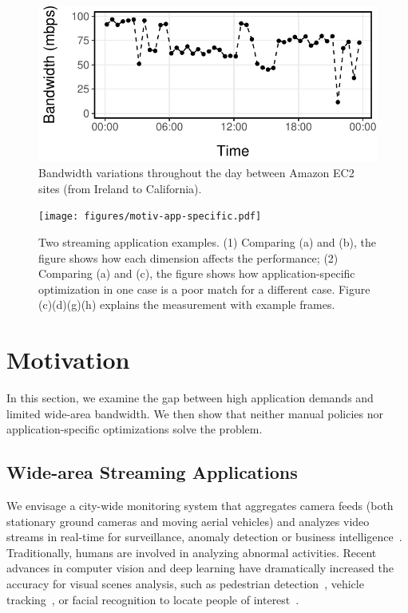 \begin{figure}
  \centering
  \includegraphics[width=.95\linewidth]{figures/aws-variation.pdf}
  \caption{Bandwidth variations throughout the day between Amazon EC2 sites
    (from Ireland to California).}
  \label{fig:bw}
\end{figure}

\begin{figure}
  \centering
  \texttt{[image: figures/motiv-app-specific.pdf]}
  \caption{Two streaming application examples. (1) Comparing (a) and (b), the
    figure shows how each dimension affects the performance; (2) Comparing (a)
    and (c), the figure shows how application-specific optimization in one case
    is a poor match for a different case. Figure (c)(d)(g)(h) explains the
    measurement with example frames.}
  \label{fig:app-specific}
\end{figure}

\section{Motivation}
\label{sec:motivation}

In this section, we examine the gap between high application demands and limited
wide-area bandwidth. We then show that neither manual policies nor
application-specific optimizations solve the problem.

\subsection{Wide-area Streaming Applications}
\label{sec:wide-area-streaming}

 We envisage a city-wide monitoring system that
aggregates camera feeds (both stationary ground cameras and moving aerial
vehicles) and analyzes video streams in real-time for surveillance, anomaly
detection or business intelligence~\cite{oh2011large}. Traditionally, humans are
involved in analyzing abnormal activities. Recent advances in computer vision
and deep learning have dramatically increased the accuracy for visual scenes
analysis, such as pedestrian detection~\cite{dollar2012pedestrian}, vehicle
tracking~\cite{coifman1998real}, or facial recognition to locate people of
interest~\cite{parkhi2015deep, Lu:2015:SHF:2888116.2888245}.

